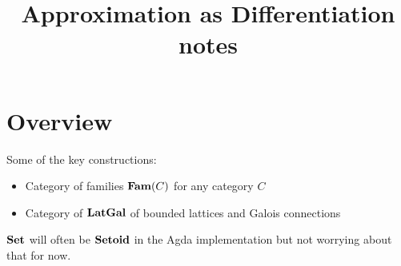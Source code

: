 \documentclass[acmsmall,nonacm]{acmart}
\begin{document}
\title{Approximation as Differentiation notes}
\maketitle

\section{Overview}

Some of the key constructions:
\begin{itemize}
\item Category of families $\mathbf{Fam}(C)$ for any category $C$
\item Category of $\mathbf{LatGal}$ of bounded lattices and Galois connections
\end{itemize}

\noindent $\mathbf{Set}$ will often be $\mathbf{Setoid}$ in the Agda implementation but not worrying about that for now.


% 
\end{document}
